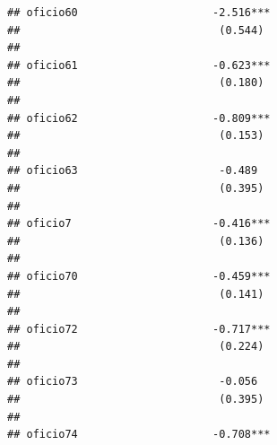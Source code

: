 \documentclass[
]{article}
\begin{document}
\begin{verbatim}
## oficio60                     -2.516***                                                              
##                               (0.544)                                                               
##                                                                                                     
## oficio61                     -0.623***                                                              
##                               (0.180)                                                               
##                                                                                                     
## oficio62                     -0.809***                                                              
##                               (0.153)                                                               
##                                                                                                     
## oficio63                      -0.489                                                                
##                               (0.395)                                                               
##                                                                                                     
## oficio7                      -0.416***                                                              
##                               (0.136)                                                               
##                                                                                                     
## oficio70                     -0.459***                                                              
##                               (0.141)                                                               
##                                                                                                     
## oficio72                     -0.717***                                                              
##                               (0.224)                                                               
##                                                                                                     
## oficio73                      -0.056                                                                
##                               (0.395)                                                               
##                                                                                                     
## oficio74                     -0.708***                                                              

\end{verbatim}
\end{document}
